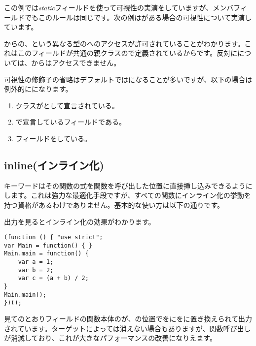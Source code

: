 この例では\emph{static}フィールドを使って可視性の実演をしていますが、メンバフィールドでもこのルールは同じです。次の例はがある場合の可視性について実演しています。


からの、という異なる型のへのアクセスが許可されていることがわかります。これはこのフィールドが共通の親クラスので定義されているからです。反対にについては、からはアクセスできません。

可視性の修飾子の省略はデフォルトではになることが多いですが、以下の場合は例外的にになります。

\begin{enumerate}
	\item クラスがとして宣言されている。
	\item {}で宣言しているフィールドである。
	\item {}フィールドをしている。
\end{enumerate}


\subsection{inline(インライン化)}
\label{class-field-inline}

キーワードはその関数の式を関数を呼び出した位置に直接挿し込みできるようにします。これは強力な最適化手段ですが、すべての関数にインライン化の挙動を持つ資格があるわけでありません。基本的な使い方は以下の通りです。


出力を見るとインライン化の効果がわかります。

\begin{lstlisting}
(function () { "use strict";
var Main = function() { }
Main.main = function() {
	var a = 1;
	var b = 2;
	var c = (a + b) / 2;
}
Main.main();
})();
\end{lstlisting}

見てのとおりフィールドの関数本体のが、の位置でをにをに置き換えられて出力されています。ターゲットによっては消えない場合もありますが、関数呼び出しが消滅しており、これが大きなパフォーマンスの改善になりえます。

